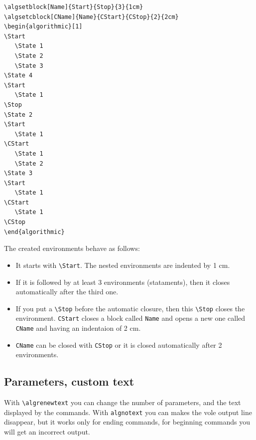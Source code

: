 \documentclass{article}
\begin{document}
\begin{minipage}[b]{0.5\linewidth}
\begin{minipage}[b]{0.5\linewidth}
\begin{minipage}[b]{0.5\linewidth}
\begin{minipage}[b]{0.5\linewidth}
\begin{minipage}[b]{0.5\linewidth}
\begin{minipage}[b]{0.5\linewidth}
\begin{minipage}[b]{0.5\linewidth}
\bigskip\noindent\begin{minipage}[b]{0.5\linewidth}
\begin{verbatim}
\algsetblock[Name]{Start}{Stop}{3}{1cm}
\algsetcblock[CName]{Name}{CStart}{CStop}{2}{2cm}
\begin{algorithmic}[1]
\Start
   \State 1
   \State 2
   \State 3
\State 4
\Start
   \State 1
\Stop
\State 2
\Start
   \State 1
\CStart
   \State 1
   \State 2
\State 3
\Start
   \State 1
\CStart
   \State 1
\CStop
\end{algorithmic}
\end{verbatim}
\end{minipage}
\begin{minipage}[b]{0.5\linewidth}
{
\begin{algorithmic}[1]
\Start
\Start
\Stop
{}
\Start
\CStart
\Start
\CStart
\CStop
\Statex
\end{algorithmic}
}
\end{minipage}\bigskip

The created environments behave as follows:

\begin{itemize}
\item It starts with \verb:\Start:. The nested environments are 
indented by 1 cm.
\item If it is followed by at least 3 environments (stataments), then it closes 
automatically after the third one.
\item If you put a \verb:\Stop: before the automatic closure, then this 
\verb:\Stop: closes the environment. \verb:CStart: closes a block called \verb:Name:
and opens a new one called \verb:CName: and having an indentaion of 2 cm.
\item \verb:CName: can be closed with \verb:CStop: or it is closed automatically after
2 environments.
\end{itemize}

\subsection{Parameters, custom text}\label{custom text}

With \verb:\algrenewtext: you can change the number of parameters, and the text displayed by the
commands. With \verb:algnotext: you can makes the vole output line disappear, but
it works only for ending commands, for beginning commands you will get an incorrect output.


\end{minipage}
\end{minipage}
\end{minipage}
\end{minipage}
\end{minipage}
\end{minipage}
\end{minipage}
\end{document}
